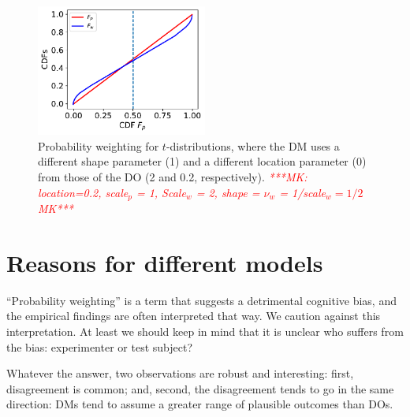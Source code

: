 \documentclass[a4paper, 12pt]{article}
\newcommand{\flabel}[1]{\label{fig:#1}}
\newcommand{\seclabel}[1]{\label{sec:#1}}
\newcommand{\ND}{\mathcal{N}} %
\newcommand{\MK}[1]{\textcolor{red}{\textit{***MK: #1 MK***}}}
\begin{document}
\begin{figure}[htb]
\centering
\includegraphics[width=0.5\textwidth]{./figs/Student-t.pdf}
\caption{Probability weighting for $t$-distributions, where the DM uses a different shape parameter (1) and a different location parameter (0) from those of the DO (2 and 0.2, respectively).
\MK{location=0.2, scale$_p$ = 1, Scale$_w$ = 2, shape = $\nu_w$ = 1/scale$_w = 1/2$}
}
\flabel{fat_tailed_CDF}
\end{figure}



\FloatBarrier
\section{Reasons for different models\seclabel{Reasons_for}}
``Probability weighting'' is a term that suggests a detrimental cognitive bias, and the empirical findings are often interpreted that way. We caution against this interpretation. At least we should keep in mind that it is unclear who suffers from the bias: experimenter or test subject? 

Whatever the answer, two observations are robust and interesting: first, disagreement is common; and, second, the disagreement tends to go in the same direction: DMs tend to assume a greater range of plausible outcomes than DOs. 

\end{document}
